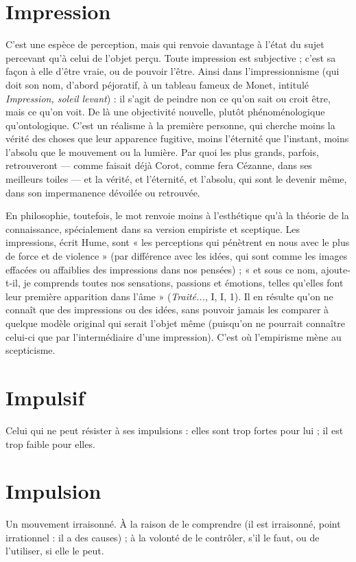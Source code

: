 \section{Impression}
C’est une espèce de perception, mais qui renvoie davantage
à l’état du sujet percevant qu’à celui de l’objet perçu. Toute
impression est subjective ; c’est sa façon à elle d’être vraie, ou de pouvoir l'être.
Ainsi dans l’impressionnisme (qui doit son nom, d’abord péjoratif, à un
tableau fameux de Monet, intitulé {\it Impression, soleil levant}) : il s’agit de peindre
non ce qu’on sait ou croit être, mais ce qu’on voit. De là une objectivité nouvelle,
plutôt phénoménologique qu’ontologique. C’est un réalisme à la première personne,
qui cherche moins la vérité des choses que leur apparence fugitive,
moins l’éternité que l’instant, moins l’absolu que le mouvement ou la
lumière. Par quoi les plus grands, parfois, retrouveront — comme faisait déjà
Corot, comme fera Cézanne, dans ses meilleurs toiles — et la vérité, et l’éternité,
et l’absolu, qui sont le devenir même, dans son impermanence dévoilée ou
retrouvée.

En philosophie, toutefois, le mot renvoie moins à l'esthétique qu’à la
théorie de la connaissance, spécialement dans sa version empiriste et sceptique.
Les impressions, écrit Hume, sont « les perceptions qui pénètrent en nous avec
le plus de force et de violence » (par différence avec les idées, qui sont comme
les images effacées ou affaiblies des impressions dans nos pensées) ; « et sous ce
nom, ajoute-t-il, je comprends toutes nos sensations, passions et émotions,
telles qu’elles font leur première apparition dans l’âme » ({\it Traité...}, I, I, 1). Il en
résulte qu’on ne connaît que des impressions ou des idées, sans pouvoir jamais
les comparer à quelque modèle original qui serait l’objet même (puisqu'on ne
pourrait connaître celui-ci que par l'intermédiaire d’une impression). C’est où
l’empirisme mène au scepticisme.

\section{Impulsif}
Celui qui ne peut résister à ses impulsions : elles sont trop fortes
pour lui ; il est trop faible pour elles.

\section{Impulsion}
Un mouvement irraisonné. À la raison de le comprendre (il
est irraisonné, point irrationnel : il a des causes) ; à la volonté
de le contrôler, s’il le faut, ou de l’utiliser, si elle le peut.

